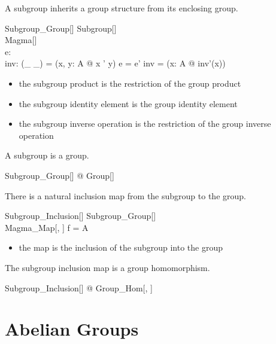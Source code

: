 \documentclass{amsart}
\begin{document}
A subgroup inherits a group structure from its enclosing group.

\begin{schema}{Subgroup\_Group}[\genT]
	Subgroup[\genT] \\
	Magma[\genT] \\
	e: \genT \\
	inv: \genT \pfun \genT
\where
	(\_ \opG \_) = (\lambda x, y: A @ x \opG' y)
\also
	e = e'
\also
	inv = (\lambda x: A @ inv'(x))
\end{schema}

\begin{itemize}
	\item the subgroup product is the restriction of the group product
	\item the subgroup identity element is the group identity element
	\item the subgroup inverse operation is the restriction of the group inverse operation
\end{itemize}

\begin{remark}
A subgroup is a group.

\begin{zed}
	\forall Subgroup\_Group[\setT] @ Group[\setT]
\end{zed}

\end{remark}

There is a natural inclusion map from the subgroup to the group.

\begin{schema}{Subgroup\_Inclusion}[\genT]
	Subgroup\_Group[\genT] \\
	Magma\_Map[\genT, \genT]
\where
	f = \id A
\end{schema}

\begin{itemize}
	\item the map is the inclusion of the subgroup into the group
\end{itemize}

\begin{remark}
The subgroup inclusion map is a group homomorphism.

\begin{zed}
	\forall Subgroup\_Inclusion[\setT] @ Group\_Hom[\setT, \setT]
\end{zed}

\end{remark}

\section{Abelian Groups}
\end{document}
